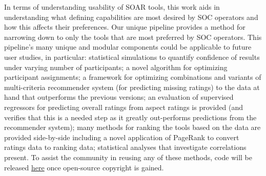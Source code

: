 In terms of understanding usability of SOAR tools, this work aids in understanding what defining capabilities are most desired by SOC operators and how this affects their preferences. 
Our unique pipeline provides a method for narrowing down to only the tools that are most preferred by SOC operators. 
This pipeline's many unique and modular components could be applicable to future user studies, in particular: 
statistical simulations to quantify confidence of results under varying number of participants;
a novel algorithm for optimizing participant assignments; 
a framework for optimizing combinations and variants of multi-criteria recommender system (for predicting missing ratings) to the data at hand that outperforms the previous versions; 
an evaluation of supervised regressors for predicting overall ratings from aspect ratings is provided (and verifies that this is a needed step as it greatly out-performs predictions from the recommender system); 
many methods for ranking the tools based on the data are provided side-by-side including a novel application of PageRank to convert ratings data to ranking data; 
statistical analyses that investigate correlations present. 
To assist the community in reusing any of these methods, code will be released \href{https://github.com/noremsa/SurveyAnalysisFramework}{here} once open-source copyright is gained. 


